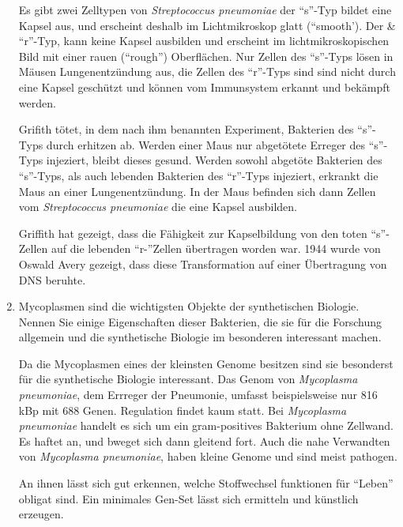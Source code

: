 \begin{enumerate}
		Es gibt zwei Zelltypen von \emph{Streptococcus pneumoniae} der ``s''-Typ
		bildet eine Kapsel aus, und erscheint deshalb im Lichtmikroskop glatt (``smooth').
		Der \& ``r''-Typ, kann keine Kapsel ausbilden und erscheint im lichtmikroskopischen Bild
		mit einer rauen (``rough'') Oberflächen.
		Nur Zellen des ``s''-Typs lösen in Mäusen Lungenentzündung aus,
		die Zellen des ``r''-Typs sind sind nicht durch eine Kapsel geschützt und können
		vom Immunsystem erkannt und bekämpft werden.

		Grifith tötet, in dem nach ihm benannten Experiment,
		Bakterien des ``s''-Typs durch erhitzen ab.
		Werden einer Maus nur abgetötete Erreger des ``s''-Typs injeziert,
		bleibt dieses gesund.
		Werden sowohl abgetöte Bakterien des ``s''-Typs,
		als auch lebenden Bakterien des ``r''-Typs injeziert,
		erkrankt die Maus an einer Lungenentzündung.
		In der Maus befinden sich dann Zellen vom \emph{Streptococcus pneumoniae} 
		die eine Kapsel ausbilden.

		Griffith hat gezeigt, dass die Fähigkeit zur Kapselbildung von den toten ``s''-Zellen
		auf die lebenden ``r-''Zellen übertragen worden war.
		1944 wurde von Oswald Avery gezeigt,
		dass diese Transformation auf einer Übertragung von DNS beruhte.


		\item Mycoplasmen sind die wichtigsten Objekte der synthetischen Biologie. 
		Nennen Sie einige Eigenschaften dieser Bakterien,
		die sie für die Forschung allgemein und die synthetische Biologie im besonderen interessant machen. \hfill \vspace{4mm}

		Da die Mycoplasmen eines der kleinsten Genome besitzen sind sie besonderst für die synthetische Biologie interessant.
		Das Genom von \emph{Mycoplasma pneumoniae},
		dem Errreger der Pneumonie,
		umfasst beispielsweise nur 816 kBp mit 688 Genen.
		Regulation findet kaum statt.
		Bei \emph{Mycoplasma pneumoniae} handelt es sich um ein gram-positives Bakterium ohne Zellwand.
		Es haftet an, und bweget sich dann gleitend fort.
		Auch die nahe Verwandten von \emph{Mycoplasma pneumoniae},
		haben kleine Genome und sind meist pathogen.

		An ihnen lässt sich gut erkennen,
		welche Stoffwechsel funktionen für ``Leben'' obligat sind.
		Ein minimales Gen-Set lässt sich ermitteln und künstlich erzeugen.

	\end{enumerate}

